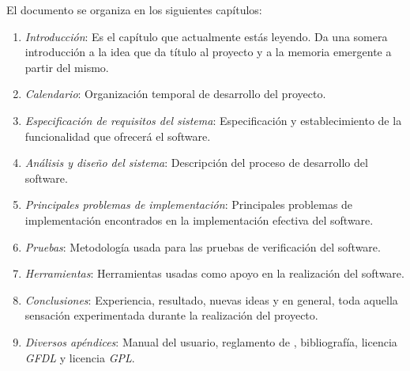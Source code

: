 El documento se organiza en los siguientes capítulos:

\begin{enumerate}
\item \textit{Introducción}: Es el capítulo que actualmente estás
  leyendo. Da una somera introducción a la idea que da título al
  proyecto y a la memoria emergente a partir del mismo. 
\item \textit{Calendario}: Organización temporal de desarrollo del
  proyecto.
\item \textit{Especificación de requisitos del sistema}:
  Especificación y establecimiento de la funcionalidad que ofrecerá el
  software.
\item \textit{Análisis y diseño del sistema}: Descripción del proceso
  de desarrollo del software.
\item \textit{Principales problemas de implementación}: Principales
  problemas de implementación encontrados en la implementación
  efectiva del software.
\item \textit{Pruebas}: Metodología usada para las pruebas de
  verificación del software.
\item \textit{Herramientas}: Herramientas usadas como apoyo en la
  realización del software.
\item \textit{Conclusiones}: Experiencia, resultado, nuevas ideas y en
  general, toda aquella sensación experimentada durante la realización
  del proyecto.
\item \textit{Diversos apéndices}: Manual del usuario, reglamento de
  \gomf, bibliografía, licencia \emph{GFDL} y licencia \emph{GPL}. 
\end{enumerate}

